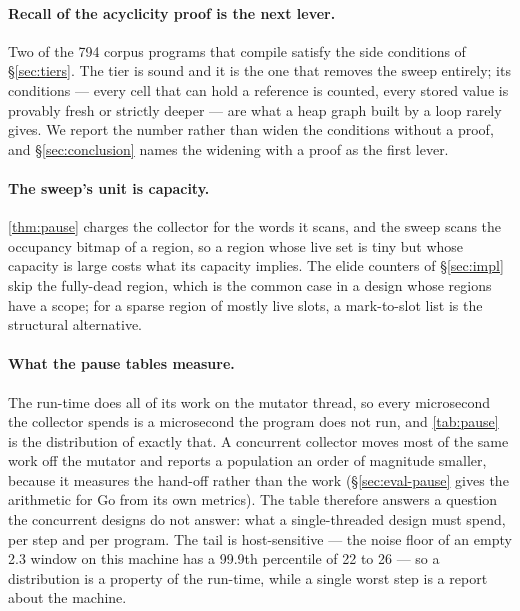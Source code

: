 \paragraph{Recall of the acyclicity proof is the next lever.}
Two of the 794 corpus programs that compile satisfy the side conditions of \S\ref{sec:tiers}.  The
tier is sound and it is the one that removes the sweep entirely; its conditions --- every cell that
can hold a reference is counted, every stored value is provably fresh or strictly deeper --- are what
a heap graph built by a loop rarely gives.  We report the number rather than widen the conditions
without a proof, and \S\ref{sec:conclusion} names the widening with a proof as the first lever.

\paragraph{The sweep's unit is capacity.}
\thm\ref{thm:pause} charges the collector for the words it scans, and the sweep scans the occupancy
bitmap of a region, so a region whose live set is tiny but whose capacity is large costs what its
capacity implies.  The elide counters of \S\ref{sec:impl} skip the fully-dead region, which is the
common case in a design whose regions have a scope; for a sparse region of mostly live slots, a
mark-to-slot list is the structural alternative.

\paragraph{What the pause tables measure.}
The run-time does all of its work on the mutator thread, so every microsecond the collector spends is
a microsecond the program does not run, and \tab\ref{tab:pause} is the distribution of exactly that.
A concurrent collector moves most of the same work off the mutator and reports a population an order
of magnitude smaller, because it measures the hand-off rather than the work
(\S\ref{sec:eval-pause} gives the arithmetic for Go from its own metrics).  The table therefore
answers a question the concurrent designs do not answer: what a single-threaded design must spend,
per step and per program.  The tail is host-sensitive --- the noise floor of an empty 2.3 \us window
on this machine has a 99.9th percentile of 22 to 26 \us --- so a distribution is a property of the
run-time, while a single worst step is a report about the machine.

